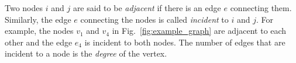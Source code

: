 Two nodes $i$ and $j$ are said to be \emph{adjacent} if there is an edge $e$ connecting them. Similarly, the edge $e$ connecting the nodes is called \emph{incident} to $i$ and $j$. For example, the nodes $v_1$ and $v_4$ in Fig.~\ref{fig:example_graph} are adjacent to each other and the edge $e_4$ is incident to both nodes. The number of edges that are incident to a node is the \emph{degree} of the vertex. 

